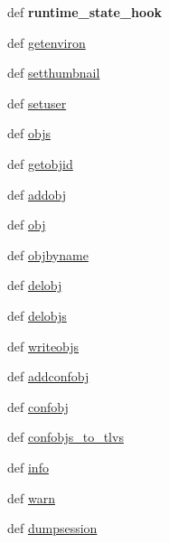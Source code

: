 \begin{DoxyCompactItemize}
\item 
\hypertarget{classcore_1_1session_1_1_session_a78dc6d2c917c4192a45046345b1d8545}{def {\bfseries runtime\+\_\+state\+\_\+hook}}\label{classcore_1_1session_1_1_session_a78dc6d2c917c4192a45046345b1d8545}

\item 
def \hyperlink{classcore_1_1session_1_1_session_a7a65807fb0cb54f45ce131690beb746c}{getenviron}
\item 
def \hyperlink{classcore_1_1session_1_1_session_a9ee12362a392a145c93c02562bfff21c}{setthumbnail}
\item 
def \hyperlink{classcore_1_1session_1_1_session_a0c8fb29e7eb9c2d12293531baf9f6b8c}{setuser}
\item 
def \hyperlink{classcore_1_1session_1_1_session_a76df773fb487782a0f9f3860119e20b9}{objs}
\item 
def \hyperlink{classcore_1_1session_1_1_session_a9585bcec7b32cb602a277c8a3a5e5927}{getobjid}
\item 
def \hyperlink{classcore_1_1session_1_1_session_a4f7ade5ffca9e433759e9043e51fcc59}{addobj}
\item 
def \hyperlink{classcore_1_1session_1_1_session_a77164ad280f946be242f66969a6eba85}{obj}
\item 
def \hyperlink{classcore_1_1session_1_1_session_a295489c2f4cfcc76a09be194e80de3b2}{objbyname}
\item 
def \hyperlink{classcore_1_1session_1_1_session_a8ad66322f8df7ad3055a9ee32d06c03e}{delobj}
\item 
def \hyperlink{classcore_1_1session_1_1_session_a6fe8878db7fad968c01fb200459d2e2e}{delobjs}
\item 
def \hyperlink{classcore_1_1session_1_1_session_ac6f2e0c3ed04c106e605bf0758da3b3e}{writeobjs}
\item 
def \hyperlink{classcore_1_1session_1_1_session_a3a8c1554673034adaf9c54a056e498e0}{addconfobj}
\item 
def \hyperlink{classcore_1_1session_1_1_session_a9edb2669a035665dfc71575f7c9d869c}{confobj}
\item 
def \hyperlink{classcore_1_1session_1_1_session_a2ac2506941c95961a923aec6aee4aa9e}{confobjs\+\_\+to\+\_\+tlvs}
\item 
def \hyperlink{classcore_1_1session_1_1_session_a9a486fc1a50a64f801dd7833ba51541d}{info}
\item 
def \hyperlink{classcore_1_1session_1_1_session_aa4229f336722173d4baffd95edbd9d8b}{warn}
\item 
def \hyperlink{classcore_1_1session_1_1_session_a1e26e4c77a0c48228581ce46fd071812}{dumpsession}

\end{DoxyCompactItemize}
